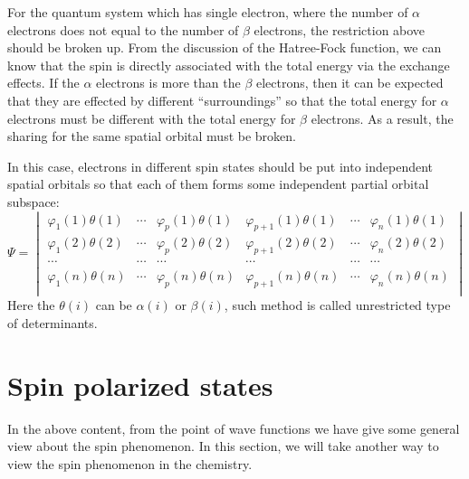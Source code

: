 For the quantum system which has single electron, where the number of
$\alpha$ electrons does not equal to the number of $\beta$ electrons,
the restriction above should be broken up. From the discussion of the
Hatree-Fock function, we can know that the spin is directly associated
with the total energy via the exchange effects. If the $\alpha$
electrons is more than the $\beta$ electrons, then it can be expected
that they are effected by different ``surroundings'' so that the total
energy for $\alpha$ electrons must be different with the total energy
for $\beta$ electrons. As a result, the sharing for the same spatial
orbital must be broken.

In this case, electrons in different spin states should be put into
independent spatial orbitals so that each of them forms some
independent partial orbital subspace:
\begin{equation}\label{}
\Psi =
 \begin{vmatrix}
   \varphi_{1}(1)\theta(1) &  \cdots & \varphi_{p}(1)\theta(1) & 
   \varphi_{p+1}(1)\theta(1) & \cdots  & \varphi_{n}(1)\theta(1)  \\
   \varphi_{1}(2)\theta(2) &  \cdots & \varphi_{p}(2)\theta(2) & 
   \varphi_{p+1}(2)\theta(2) & \cdots  & \varphi_{n}(2)\theta(2)  \\
   \cdots                  & \cdots  & \cdots                 & 
   \cdots                   & \cdots  & \cdots                  \\
   \varphi_{1}(n)\theta(n) & \cdots  & \varphi_{p}(n)\theta(n) & 
   \varphi_{p+1}(n)\theta(n) & \cdots  & \varphi_{n}(n)\theta(n)  \\
 \end{vmatrix}
\end{equation}
Here the $\theta(i)$ can be $\alpha(i)$ or $\beta(i)$, such method is
called unrestricted type of determinants.


\section{Spin polarized states}
%
%
In the above content, from the point of wave functions we have give
some general view about the spin phenomenon. In this section, we
will take another way to view the spin phenomenon in the chemistry.

